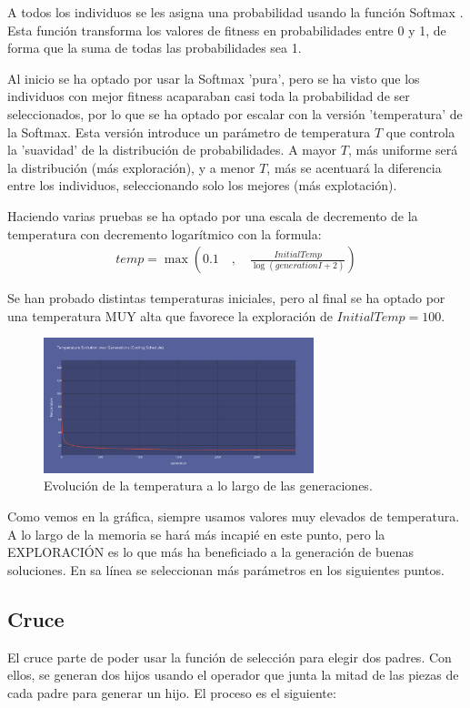 \documentclass[11pt,spanish,listoffigures,listoftables]{tfgetsinf}
\begin{document}
A todos los individuos se les asigna una probabilidad usando la función Softmax \cite{}. Esta función transforma los valores de fitness en probabilidades entre 0 y 1, de forma que la suma de todas las probabilidades sea 1. 

Al inicio se ha optado por usar la Softmax 'pura', pero se ha visto que los individuos con mejor fitness acaparaban casi toda la probabilidad de ser seleccionados, por lo que se ha optado por escalar con la versión 'temperatura' de la Softmax. Esta versión introduce un parámetro de temperatura $T$ que controla la 'suavidad' de la distribución de probabilidades. A mayor $T$, más uniforme será la distribución (más exploración), y a menor $T$, más se acentuará la diferencia entre los individuos, seleccionando solo los mejores (más explotación).

Haciendo varias pruebas se ha optado por una escala de decremento de la temperatura con decremento logarítmico con la formula:
\begin{align*}
    temp = \max(0.1\quad, \quad\frac{InitialTemp}{\log(generationI + 2)})
\end{align*}

Se han probado distintas temperaturas iniciales, pero al final se ha optado por una temperatura MUY alta que favorece la exploración de $InitialTemp = 100$. 

\begin{figure}[H]
    \centering
    \includegraphics[width=0.7\textwidth]{images/GA_temp_evolution.png}
    \caption{Evolución de la temperatura a lo largo de las generaciones.}
    \label{fig:temp_evolution}
\end{figure}

Como vemos en la gráfica, siempre usamos valores muy elevados de temperatura. A lo largo de la memoria se hará más incapié en este punto, pero la EXPLORACIÓN es lo que más ha beneficiado a la generación de buenas soluciones. En sa línea se seleccionan más parámetros en los siguientes puntos.

\subsection{Cruce}
El cruce parte de poder usar la función de selección para elegir dos padres. Con ellos, se generan dos hijos usando el operador que junta la mitad de las piezas de cada padre para generar un hijo. El proceso es el siguiente:
\end{document}
